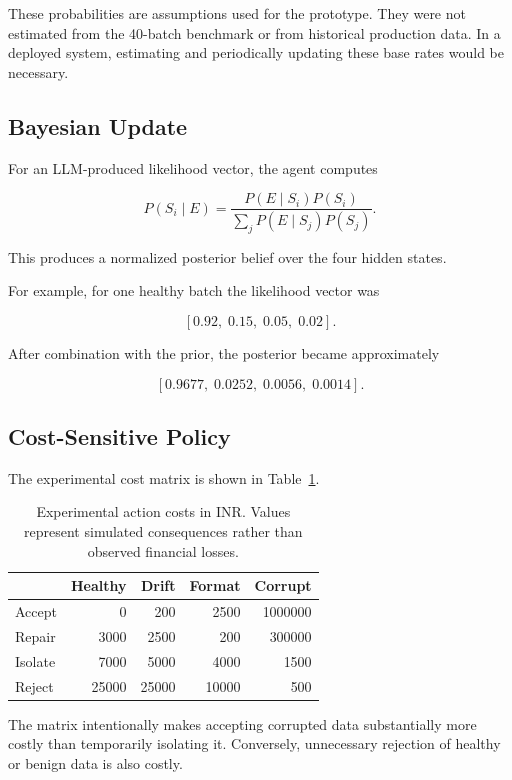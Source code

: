 \documentclass{article}
\begin{document}
These probabilities are assumptions used for the prototype. They were not estimated from the 40-batch benchmark or from historical production data. In a deployed system, estimating and periodically updating these base rates would be necessary.


\subsection{Bayesian Update}

For an LLM-produced likelihood vector, the agent computes

\[
P(S_i\mid E)
=
\frac{
P(E\mid S_i)P(S_i)
}{
\sum_j P(E\mid S_j)P(S_j)
}.
\]

This produces a normalized posterior belief over the four hidden states.

For example, for one healthy batch the likelihood vector was

\[
[0.92,\;0.15,\;0.05,\;0.02].
\]

After combination with the prior, the posterior became approximately

\[
[0.9677,\;0.0252,\;0.0056,\;0.0014].
\]


\subsection{Cost-Sensitive Policy}

The experimental cost matrix is shown in Table~\ref{tab:costmatrix}.

\begin{table}[t]
\centering
\small
\begin{tabular}{lrrrr}
\toprule
 & Healthy & Drift & Format & Corrupt \\
\midrule
Accept  & 0     & 200   & 2500  & 1000000 \\
Repair  & 3000  & 2500  & 200   & 300000 \\
Isolate & 7000  & 5000  & 4000  & 1500 \\
Reject  & 25000 & 25000 & 10000 & 500 \\
\bottomrule
\end{tabular}
\caption{Experimental action costs in INR. Values represent simulated consequences rather than observed financial losses.}
\label{tab:costmatrix}
\end{table}

The matrix intentionally makes accepting corrupted data substantially more costly than temporarily isolating it. Conversely, unnecessary rejection of healthy or benign data is also costly.
\end{document}
